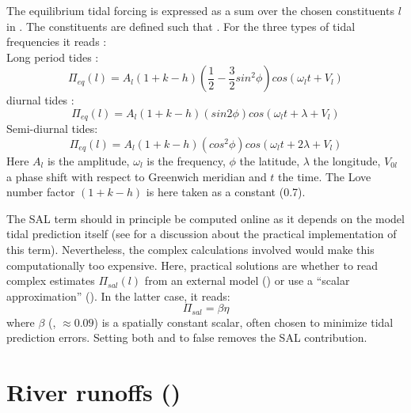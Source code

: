 \documentclass[../tex_main/NEMO_manual]{subfiles}
\begin{document}
The equilibrium tidal forcing is expressed as a sum over the chosen constituents $l$ in . The constituents are defined such that . For the three types of tidal frequencies it reads : \\
Long period tides :
\begin{equation}
\Pi_{eq}(l)=A_{l}(1+k-h)(\frac{1}{2}-\frac{3}{2}sin^{2}\phi)cos(\omega_{l}t+V_{l})
\end{equation}
diurnal tides :
\begin{equation}
\Pi_{eq}(l)=A_{l}(1+k-h)(sin 2\phi)cos(\omega_{l}t+\lambda+V_{l})
\end{equation}
Semi-diurnal tides:
\begin{equation}
\Pi_{eq}(l)=A_{l}(1+k-h)(cos^{2}\phi)cos(\omega_{l}t+2\lambda+V_{l})
\end{equation}
Here $A_{l}$ is the amplitude, $\omega_{l}$ is the frequency, $\phi$ the latitude, $\lambda$ the longitude, $V_{0l}$ a phase shift with respect to Greenwich meridian and $t$ the time. The Love number factor $(1+k-h)$ is here taken as a constant (0.7).

The SAL term should in principle be computed online as it depends on the model tidal prediction itself (see \citet{Arbic2004} for a discussion about the practical implementation of this term). Nevertheless, the complex calculations involved would make this computationally too expensive. Here, practical solutions are whether to read complex estimates $\Pi_{sal}(l)$ from an external model () or use a ``scalar approximation'' (). In the latter case, it reads:\\
\begin{equation}
\Pi_{sal} = \beta \eta
\end{equation}
where $\beta$ (, $\approx0.09$) is a spatially constant scalar, often chosen to minimize tidal prediction errors. Setting both  and  to false removes the SAL contribution.

\section{River runoffs (\protect{})}
\label{sec:SBC_rnf}
\end{document}
